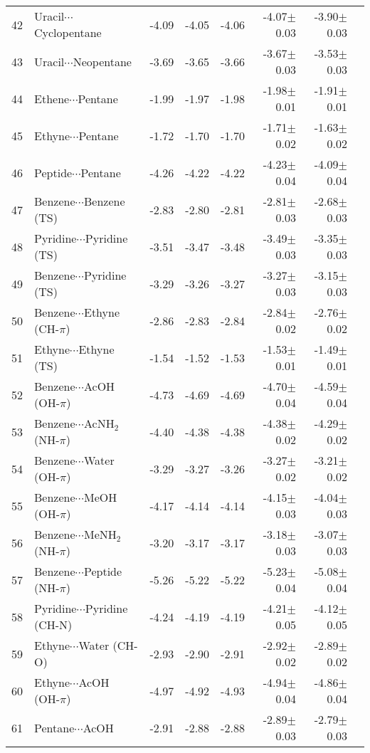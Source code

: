 \begin{longtable}{llrrrrrr}
42 & Uracil$\cdots$Cyclopentane & -4.09 & -4.05 & -4.06 & -4.07$\pm$0.03 & -3.90$\pm$0.03 \\
43 & Uracil$\cdots$Neopentane & -3.69 & -3.65 & -3.66 & -3.67$\pm$0.03 & -3.53$\pm$0.03 \\
44 & Ethene$\cdots$Pentane & -1.99 & -1.97 & -1.98 & -1.98$\pm$0.01 & -1.91$\pm$0.01 \\
45 & Ethyne$\cdots$Pentane & -1.72 & -1.70 & -1.70 & -1.71$\pm$0.02 & -1.63$\pm$0.02 \\
46 & Peptide$\cdots$Pentane & -4.26 & -4.22 & -4.22 & -4.23$\pm$0.04 & -4.09$\pm$0.04 \\
47 & Benzene$\cdots$Benzene (TS) & -2.83 & -2.80 & -2.81 & -2.81$\pm$0.03 & -2.68$\pm$0.03 \\
48 & Pyridine$\cdots$Pyridine (TS) & -3.51 & -3.47 & -3.48 & -3.49$\pm$0.03 & -3.35$\pm$0.03 \\
49 & Benzene$\cdots$Pyridine (TS) & -3.29 & -3.26 & -3.27 & -3.27$\pm$0.03 & -3.15$\pm$0.03 \\
50 & Benzene$\cdots$Ethyne (CH-$\pi$) & -2.86 & -2.83 & -2.84 & -2.84$\pm$0.02 & -2.76$\pm$0.02 \\
51 & Ethyne$\cdots$Ethyne (TS) & -1.54 & -1.52 & -1.53 & -1.53$\pm$0.01 & -1.49$\pm$0.01 \\
52 & Benzene$\cdots$AcOH (OH-$\pi$) & -4.73 & -4.69 & -4.69 & -4.70$\pm$0.04 & -4.59$\pm$0.04 \\
53 & Benzene$\cdots$AcNH$_2$ (NH-$\pi$) & -4.40 & -4.38 & -4.38 & -4.38$\pm$0.02 & -4.29$\pm$0.02 \\
54 & Benzene$\cdots$Water (OH-$\pi$) & -3.29 & -3.27 & -3.26 & -3.27$\pm$0.02 & -3.21$\pm$0.02 \\
55 & Benzene$\cdots$MeOH (OH-$\pi$) & -4.17 & -4.14 & -4.14 & -4.15$\pm$0.03 & -4.04$\pm$0.03 \\
56 & Benzene$\cdots$MeNH$_2$ (NH-$\pi$) & -3.20 & -3.17 & -3.17 & -3.18$\pm$0.03 & -3.07$\pm$0.03 \\
57 & Benzene$\cdots$Peptide (NH-$\pi$) & -5.26 & -5.22 & -5.22 & -5.23$\pm$0.04 & -5.08$\pm$0.04 \\
58 & Pyridine$\cdots$Pyridine (CH-N) & -4.24 & -4.19 & -4.19 & -4.21$\pm$0.05 & -4.12$\pm$0.05 \\
59 & Ethyne$\cdots$Water (CH-O) & -2.93 & -2.90 & -2.91 & -2.92$\pm$0.02 & -2.89$\pm$0.02 \\
60 & Ethyne$\cdots$AcOH (OH-$\pi$) & -4.97 & -4.92 & -4.93 & -4.94$\pm$0.04 & -4.86$\pm$0.04 \\
61 & Pentane$\cdots$AcOH & -2.91 & -2.88 & -2.88 & -2.89$\pm$0.03 & -2.79$\pm$0.03 \\

\end{longtable}
